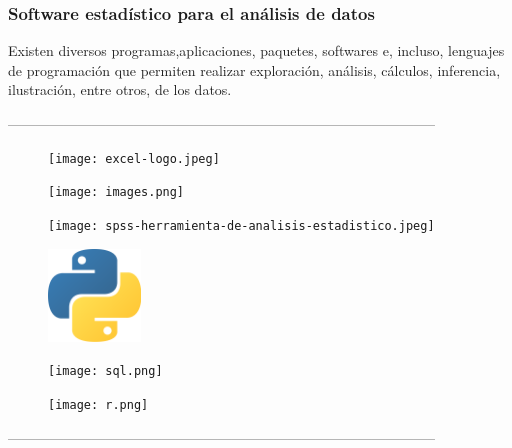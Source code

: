 \begin{frame}[fragile] 
    \frametitle{Software estadístico para el análisis de datos} 
Existen diversos programas,aplicaciones, paquetes, softwares e, incluso, lenguajes de programación que permiten realizar exploración, análisis, cálculos, inferencia, ilustración, entre otros, de los datos.\newline   

--------------------------------------------------------------------------------------------\newline  


\begin{multicols}{3}
    \begin{figure}[H]
        \raggedright
            \texttt{[image: excel-logo.jpeg]}
    \end{figure}
    \begin{figure}[H]
            \texttt{[image: images.png]}
    \end{figure}
        \begin{figure}[H]
            \texttt{[image: spss-herramienta-de-analisis-estadistico.jpeg]}\newline
    \end{figure} 
        \begin{figure}[H]
        \raggedright
            \includegraphics [width =0.22\textwidth]{python.png}
    \end{figure}
    \begin{figure}[H]
            \texttt{[image: sql.png]}
    \end{figure}
        \begin{figure}[H]
            \texttt{[image: r.png]}
    \end{figure}
\end{multicols}
--------------------------------------------------------------------------------------------
\end{frame}


